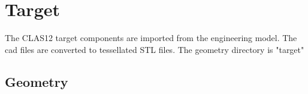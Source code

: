 \section{Target}

The CLAS12 target components are imported from the engineering model. The cad files are converted to tessellated STL files.
The geometry directory is "target"

\subsection{Geometry}
